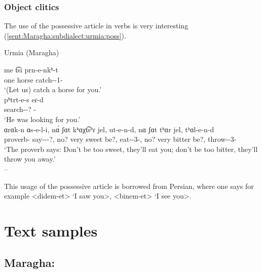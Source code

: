 \subsubsection{Object clitics}

The use of the possessive article in verbs is very interesting (\ref{sent:Maragha:subdialect:urmia:poss}).

\begin{exe}
	\ex Urmia (Maragha)
	\label{sent:Maragha:subdialect:urmia:poss}
	\begin{xlist}
		\ex \gll me t͡si prn-e-nkʰ-t \\
		one horse catch-{\thgloss}-1{\pl}-{\possSsg} \\
		\trans `(Let us) catch a horse for you.' \\
		\ex \gll pʰtrt-e-s eɾ-d\\
		search-{\thgloss}-{\impfcvb}? {\pst}-{\possSsg} \\
		\trans `He was looking for you.' \\
		\ex \gll ɑrɑk-n ɑs-e-l-i, n\'ɑ ʃɑt kʰɑχt͡sʰɾ jel, ut-e-n-d, nɑ ʃɑt tʰɑr jel, tʰɑl-e-n-d \\
		proverb-{} say-{\thgloss}-{\infgloss}-?, no? very sweet be?, eat-{\thgloss}-3{\pl}-{\possSsg}, no? very bitter be?, throw-{\thgloss}-3{\pl}-{\possSsg}\\
		\trans `The proverb says: Don't be too sweet, they'll eat you; don't be too bitter, they'll throw you away.'\\
		 -- 
		
	\end{xlist}
\end{exe}

This usage of the possessive article is borrowed from Persian, where one says for example <didem-et> `I saw you>, <binem-et> `I see you>. 

\section{Text samples}

{\sampleoverview}

\subsection{Maragha: }



